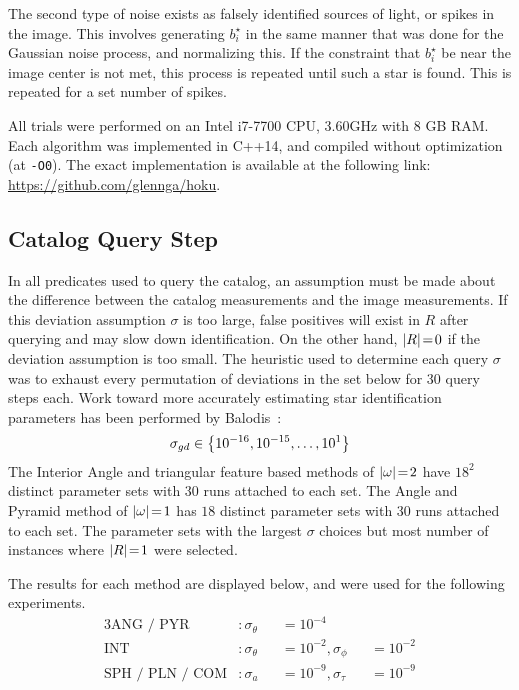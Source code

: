 \documentclass[conference]{IEEEtran}
\begin{document}
    The second type of noise exists as falsely identified sources of light, or spikes in the image.
    This involves generating $b^\star_i$ in the same manner that was done for the Gaussian noise process, and normalizing
    this.
    If the constraint that $b^\star_i$ be near the image center is not met, this process is repeated until such a star is
    found.
    This is repeated for a set number of spikes.

    All trials were performed on an Intel i7-7700 CPU, 3.60GHz with 8 GB RAM\@.
    Each algorithm was implemented in C++14, and compiled without optimization (at \texttt{-O0}).
    The exact implementation is available at the following link:
    \url{https://github.com/glennga/hoku}.

    \subsection{Catalog Query Step}\label{subsec:catalogQueryStep}
    In all predicates used to query the catalog, an assumption must be made about the difference between the catalog
    measurements and the image measurements.
    If this deviation assumption $\sigma$ is too large, false positives will exist in $R$ after querying and may slow
    down identification.
    On the other hand, $\left| R \right| \!=\! 0$ if the deviation assumption is too small.
    The heuristic used to determine each query $\sigma$ was to exhaust every permutation of deviations in the set below for
    30 query steps each.
    Work toward more accurately estimating star identification parameters has been performed by
    Balodis~\cite{balodis:parametersAutomated}:
    \begin{equation}
        \sigma_{gd} \in \left\{  10^{-16}, 10^{-15}, \ldots, 10^1  \right\}
    \end{equation}
    The Interior Angle and triangular feature based methods of $\left| \omega \right| \!=\! 2$ have $18^2$ distinct parameter sets
    with 30 runs attached to each set.
    The Angle and Pyramid method of $\left| \omega \right| \!=\! 1$ has $18$ distinct parameter sets with 30 runs attached to each set.
    The parameter sets with the largest $\sigma$ choices but most number of instances where $\left| R \right| \!=\! 1$ were selected.

    The results for each method are displayed below, and were used for the following experiments.
    \begin{alignat*}{3}
        \text{ANG / PYR}&: \sigma_\theta &&= 10^{-4} &&{} \\
        \text{INT}&: \sigma_\theta &&= 10^{-2}, \sigma_\phi &&= 10^{-2} \\
        \text{SPH / PLN / COM}&: \sigma_a &&= 10^{-9}, \sigma_\tau &&= 10^{-9}
    \end{alignat*}
\end{document}
